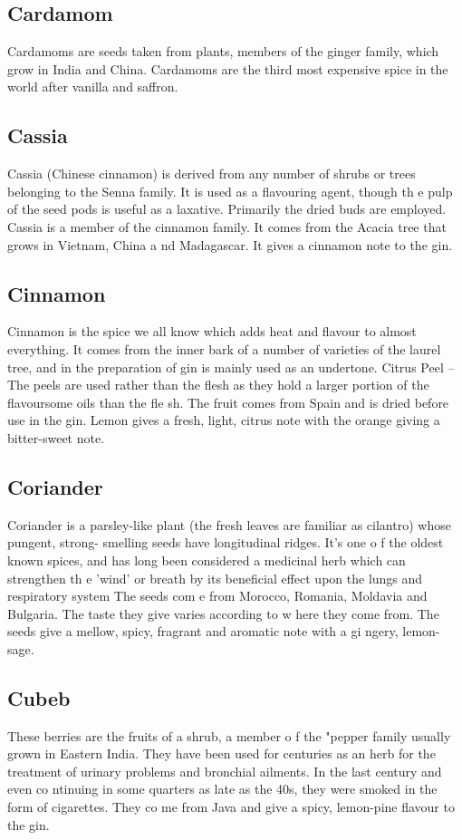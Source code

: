 \subsection{Cardamom}
Cardamoms are seeds taken from plants, members of the ginger family, which
grow in India and China. Cardamoms are the third most expensive spice in the
world after vanilla and saffron.

\subsection{Cassia}
Cassia (Chinese cinnamon) is derived from any number of shrubs or trees
belonging to the Senna family. It is used as a flavouring agent, though th e
pulp of the seed pods is useful as a laxative.  Primarily the dried buds are
employed. Cassia is a member of the cinnamon family. It comes from the Acacia
tree that grows in Vietnam, China a nd Madagascar. It gives a cinnamon note to
the gin.

\subsection{Cinnamon}
Cinnamon is the spice we all know which adds heat and flavour to almost
everything. It comes from the inner bark of a number of varieties of the laurel
tree, and in the preparation of gin is mainly used as an undertone. Citrus Peel
– The peels are used rather than the flesh as they hold a larger portion of
the flavoursome oils than the fle sh. The fruit comes from Spain and is dried
before use in the gin. Lemon gives a fresh, light, citrus note with the orange
giving a bitter-sweet note.

\subsection{Coriander}
Coriander is a parsley-like plant (the fresh leaves are familiar as cilantro)
whose pungent, strong- smelling seeds have longitudinal ridges. It’s one o f
the oldest known spices, and has long been considered a medicinal herb which
can strengthen th e 'wind' or breath by its beneficial effect upon the lungs
and respiratory system The seeds com e from Morocco, Romania, Moldavia and
Bulgaria. The taste they give varies according to w here they come from. The
seeds give a mellow, spicy, fragrant and aromatic note with a gi ngery,
lemon-sage.

\subsection{Cubeb}
These berries are the fruits of a shrub, a member o f the "pepper family
usually grown in Eastern India. They have been used for centuries as an herb
for the treatment of urinary problems and bronchial ailments. In the last
century and even co ntinuing in some quarters as late as the 40s, they were
smoked in the form of cigarettes. They co me from Java and give a spicy,
lemon-pine flavour to the gin. 

